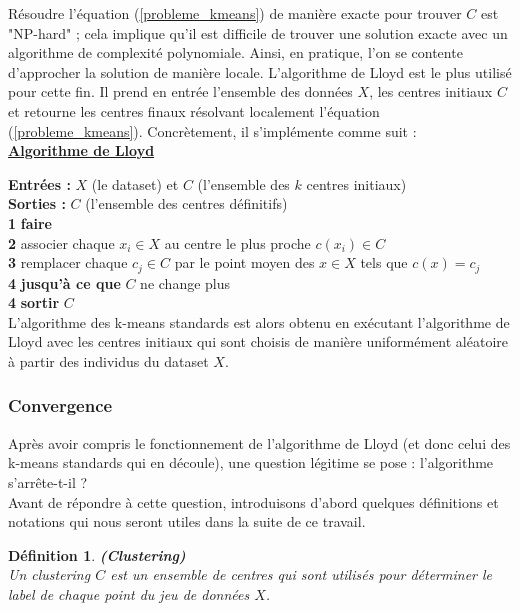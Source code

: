 \documentclass[12pt,a4paper]{book}
\newtheorem{env_definition}{Définition}
\newcommand{\1}{\mathds{1}}
\begin{document}
Résoudre l'équation (\ref{probleme_kmeans}) de manière exacte pour trouver $C$  est "NP-hard" ; cela implique qu'il est difficile de trouver une solution exacte avec un algorithme de complexité polynomiale. Ainsi, en pratique, l'on se contente d'approcher la solution de manière locale. L'algorithme de Lloyd est le plus utilisé pour cette fin. Il prend en entrée l'ensemble des données $X$, les centres initiaux $C$  et retourne les centres finaux résolvant localement l'équation (\ref{probleme_kmeans}). Concrètement, il s'implémente comme suit :  \\

\noindent \textbf{\underline{Algorithme de Lloyd}}\label{algo_lloyd}

\noindent \textbf{Entrées : } $X$ (le dataset) et $C$ (l'ensemble des $k$ centres initiaux)\\
\noindent \textbf{Sorties : } $C$ (l'ensemble des centres définitifs) \\
\textbf{1} \textbf{faire}\\
\textbf{2} \indent associer chaque $x_i \in X$ au centre le plus proche $c(x_i) \in C$\\
\textbf{3} \indent remplacer chaque $c_j \in C$ par le point moyen des $x \in X$ tels que $c(x)=c_j$\\
\textbf{4} \textbf{jusqu'à ce que } $C$  ne change plus\\
\textbf{4} \textbf{sortir} $C$\\

L'algorithme des k-means standards est alors obtenu en exécutant l'algorithme de Lloyd avec les centres initiaux qui sont choisis de manière uniformément aléatoire à partir des individus du dataset $X$.
\subsubsection{Convergence}

Après avoir compris le fonctionnement de l'algorithme de Lloyd (et donc celui des k-means standards qui en découle), une question légitime se pose : l'algorithme s'arrête-t-il ?\\ Avant de répondre à cette question, introduisons d'abord quelques définitions et notations qui nous seront utiles dans la suite de ce travail.

	\begin{env_definition}\label{clustering}
		\textbf{(Clustering)}\\
		Un clustering $C$ est un ensemble de centres qui sont utilisés pour déterminer le label de chaque point du jeu de données $X$.
	\end{env_definition}
	
\end{document}
